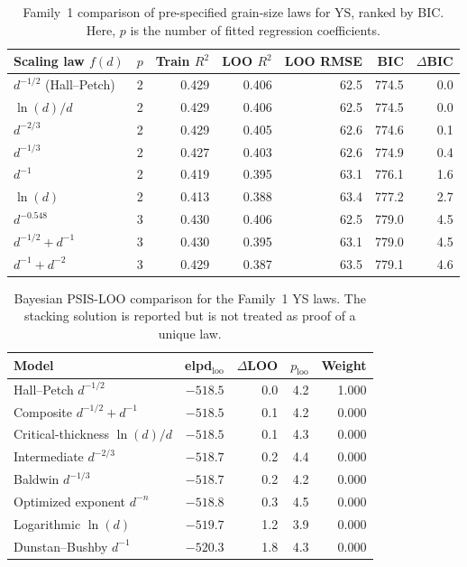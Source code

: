 \documentclass[a4paper,11pt]{article}
\begin{document}
\begin{table}[H]
\centering
\caption{Family~1 comparison of pre-specified grain-size laws for YS, ranked by BIC. Here, $p$ is the number of fitted regression coefficients.}
\label{tab:scalinglaws}
\small
\begin{tabular}{lrrrrrr}
\toprule
Scaling law $f(d)$ & $p$ & Train $R^2$ & LOO $R^2$ & LOO RMSE & BIC & $\Delta$BIC \\
\midrule
$d^{-1/2}$ (Hall--Petch) & 2 & 0.429 & 0.406 & 62.5 & 774.5 & 0.0 \\
$\ln(d)/d$ & 2 & 0.429 & 0.406 & 62.5 & 774.5 & 0.0 \\
$d^{-2/3}$ & 2 & 0.429 & 0.405 & 62.6 & 774.6 & 0.1 \\
$d^{-1/3}$ & 2 & 0.427 & 0.403 & 62.6 & 774.9 & 0.4 \\
$d^{-1}$ & 2 & 0.419 & 0.395 & 63.1 & 776.1 & 1.6 \\
$\ln(d)$ & 2 & 0.413 & 0.388 & 63.4 & 777.2 & 2.7 \\
$d^{-0.548}$ & 3 & 0.430 & 0.406 & 62.5 & 779.0 & 4.5 \\
$d^{-1/2}+d^{-1}$ & 3 & 0.430 & 0.395 & 63.1 & 779.0 & 4.5 \\
$d^{-1}+d^{-2}$ & 3 & 0.429 & 0.387 & 63.5 & 779.1 & 4.6 \\
\bottomrule
\end{tabular}
\end{table}

\begin{table}[H]
\centering
\caption{Bayesian PSIS-LOO comparison for the Family~1 YS laws. The stacking solution is reported but is not treated as proof of a unique law.}
\label{tab:bayesian}
\small
\begin{tabular}{lrrrr}
\toprule
Model & elpd$_{\mathrm{loo}}$ & $\Delta$LOO & $p_{\mathrm{loo}}$ & Weight \\
\midrule
Hall--Petch $d^{-1/2}$ & $-518.5$ & 0.0 & 4.2 & 1.000 \\
Composite $d^{-1/2}+d^{-1}$ & $-518.5$ & 0.1 & 4.2 & 0.000 \\
Critical-thickness $\ln(d)/d$ & $-518.5$ & 0.1 & 4.3 & 0.000 \\
Intermediate $d^{-2/3}$ & $-518.7$ & 0.2 & 4.4 & 0.000 \\
Baldwin $d^{-1/3}$ & $-518.7$ & 0.2 & 4.2 & 0.000 \\
Optimized exponent $d^{-n}$ & $-518.8$ & 0.3 & 4.5 & 0.000 \\
Logarithmic $\ln(d)$ & $-519.7$ & 1.2 & 3.9 & 0.000 \\
Dunstan--Bushby $d^{-1}$ & $-520.3$ & 1.8 & 4.3 & 0.000 \\
\bottomrule
\end{tabular}
\end{table}
\end{document}
